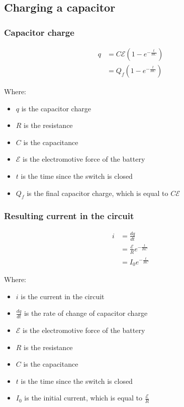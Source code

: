 \documentclass[11pt]{article}
\begin{document}
\newpage

\subsection{Charging a capacitor}
\label{sec:org9bb589c}

\subsubsection{Capacitor charge}
\label{sec:org2d46a43}
\begin{align*}
q &= C \mathcal{E} (1 - e^{- \frac{t}{RC}}) \\
&= Q_f(1 - e^{-\frac{t}{RC}})
\end{align*}

Where:
\begin{itemize}
\item \(q\) is the capacitor charge
\item \(R\) is the resistance
\item \(C\) is the capacitance
\item \(\mathcal{E}\) is the electromotive force of the battery
\item \(t\) is the time since the switch is closed
\item \(Q_f\) is the final capacitor charge, which is equal to \(C \mathcal{E}\)
\end{itemize}

\subsubsection{Resulting current in the circuit}
\label{sec:orgfbb9ab2}
\begin{align*}
i &= \frac{dq}{dt} \\
&= \frac{\mathcal{E}}{R} e^{-\frac{t}{RC}} \\
&= I_0 e^{-\frac{t}{RC}}
\end{align*}

Where:
\begin{itemize}
\item \(i\) is the current in the circuit
\item \(\frac{dq}{dt}\) is the rate of change of capacitor charge
\item \(\mathcal{E}\) is the electromotive force of the battery
\item \(R\) is the resistance
\item \(C\) is the capacitance
\item \(t\) is the time since the switch is closed
\item \(I_0\) is the initial current, which is equal to \(\frac{\mathcal{E}}{R}\)
\end{itemize}
\end{document}
